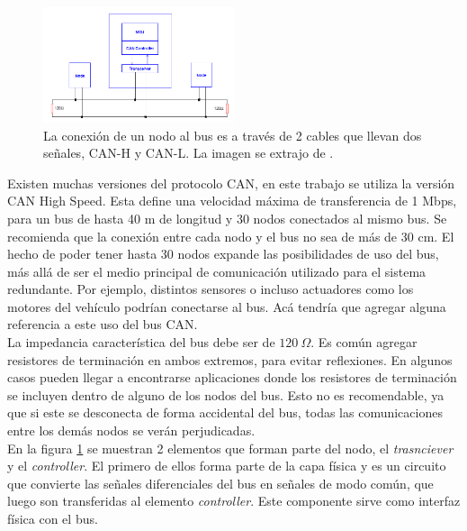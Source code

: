\begin{figure}[H]
    \centering
    \includegraphics[width=0.5\textwidth]{img/conxeion_al_bus_CAN.png}
    \caption{La conexión de un nodo al bus es a través de 2 cables que llevan dos señales, CAN-H y CAN-L. La imagen se extrajo de \cite{AN228}.}
    \label{fig:conxeion_al_bus_CAN}    
\end{figure}

Existen muchas versiones del protocolo CAN, en este trabajo se utiliza la versión CAN High Speed. Esta define una velocidad máxima de transferencia de 1 Mbps, para un bus de hasta 40 m de longitud y 30 nodos conectados al mismo bus. Se recomienda que la conexión entre cada nodo y el bus no sea de más de 30 cm. El hecho de poder tener hasta 30 nodos expande las posibilidades de uso del bus, más allá de ser el medio principal de comunicación utilizado para el sistema redundante. Por ejemplo, distintos sensores o incluso actuadores como los motores del vehículo podrían conectarse al bus. {\color{red} Acá tendría que agregar alguna referencia a este uso del bus CAN}.\\

La impedancia característica del bus debe ser de $120 \ \Omega$. Es común agregar resistores de terminación en ambos extremos, para evitar reflexiones. En algunos casos pueden llegar a encontrarse aplicaciones donde los resistores de terminación se incluyen dentro de alguno de los nodos del bus. Esto no es recomendable, ya que si este se desconecta de forma accidental del bus, todas las comunicaciones entre los demás nodos se verán perjudicadas.\\

En la figura \ref{fig:conxeion_al_bus_CAN} se muestran 2 elementos que forman parte del nodo, el \textit{trasnciever} y el \textit{controller}. El primero de ellos forma parte de la capa física y es un circuito que convierte las señales diferenciales del bus en señales de modo común, que luego son transferidas al elemento \textit{controller}. Este componente sirve como interfaz física con el bus.\\

